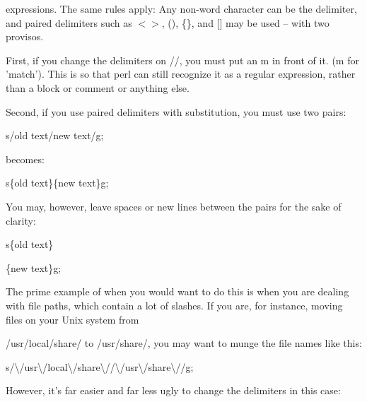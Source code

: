 \documentclass[a4paper,11pt]{book}
\begin{document}
\noindent expressions. The same rules apply: Any non-word character can be the delimiter, and paired delimiters such as $<$$>$, (), \{\}, and [] may be used -- with two provisos.

\noindent 

\noindent First, if you change the delimiters on //, you must put an m in front of it. (m for 'match'). This is so that perl can still recognize it as a regular expression, rather than a block or comment or anything else.

\noindent 

\noindent 

\noindent Second, if you use paired delimiters with substitution, you must use two pairs:

\noindent 

\noindent 

\noindent s/old text/new text/g;

\noindent 

\noindent becomes:

\noindent 

\noindent 

\noindent s\{old text\}\{new text\}g;

\noindent 

\noindent You may, however, leave spaces or new lines between the pairs for the sake of clarity:

\noindent 

\noindent 

\noindent s\{old text\}

\noindent \{new text\}g;

\noindent 

\noindent The prime example of when you would want to do this is when you are dealing with file paths, which contain a lot of slashes. If you are, for instance, moving files on your Unix system from

\noindent /usr/local/share/ to /usr/share/, you may want to munge the file names like this:

\noindent 

\noindent 

\noindent s/\textbackslash /usr\textbackslash /local\textbackslash /share\textbackslash //\textbackslash /usr\textbackslash /share\textbackslash //g;

\noindent 

\noindent However, it's far easier and far less ugly to change the delimiters in this case:

\noindent 
\end{document}
